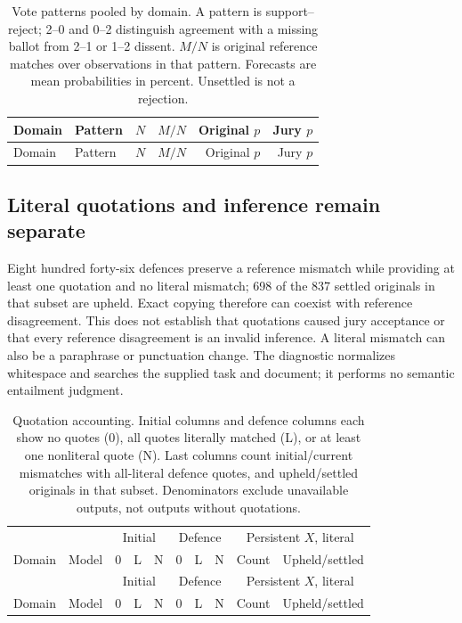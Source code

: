 \begingroup\small\setlength{\tabcolsep}{4pt}
\begin{longtable}{llrrrr}
\caption{Vote patterns pooled by domain. A pattern is support--reject;
2--0 and 0--2 distinguish agreement with a missing ballot from 2--1 or 1--2
dissent. $M/N$ is original reference matches over observations in that pattern.
Forecasts are mean probabilities in percent. Unsettled is not a rejection.}
\label{tab:diagnostic-vote-patterns}\\
\toprule Domain & Pattern & $N$ & $M/N$ & Original $p$ & Jury $p$\\\midrule\endfirsthead
\toprule Domain & Pattern & $N$ & $M/N$ & Original $p$ & Jury $p$\\\midrule\endhead

\bottomrule\end{longtable}\endgroup

\subsection{Literal quotations and inference remain separate}
\label{app:diagnostic-citations}
Eight hundred forty-six defences preserve a reference mismatch while
providing at least one quotation and no literal mismatch; 698 of the 837
settled originals in that subset are upheld. Exact copying therefore can
coexist with reference disagreement. This does not establish that quotations
caused jury acceptance or that every reference disagreement is an invalid
inference. A literal mismatch can also be a paraphrase or punctuation change.
The diagnostic normalizes whitespace and searches the supplied task and
document; it performs no semantic entailment judgment.

\begingroup\small\setlength{\tabcolsep}{3pt}
\begin{longtable}{llrrrrrrrr}
\caption{Quotation accounting. Initial columns and defence columns each show
no quotes (0), all quotes literally matched (L), or at least one nonliteral
quote (N). Last columns count initial/current mismatches with all-literal
defence quotes, and upheld/settled originals in that subset. Denominators
exclude unavailable outputs, not outputs without quotations.}
\label{tab:diagnostic-citations}\\
\toprule & & \multicolumn{3}{c}{Initial} & \multicolumn{3}{c}{Defence} & \multicolumn{2}{c}{Persistent $X$, literal}\\
Domain & Model & 0 & L & N & 0 & L & N & Count & Upheld/settled\\\midrule\endfirsthead
\toprule & & \multicolumn{3}{c}{Initial} & \multicolumn{3}{c}{Defence} & \multicolumn{2}{c}{Persistent $X$, literal}\\
Domain & Model & 0 & L & N & 0 & L & N & Count & Upheld/settled\\\midrule\endhead

\bottomrule\end{longtable}\endgroup

